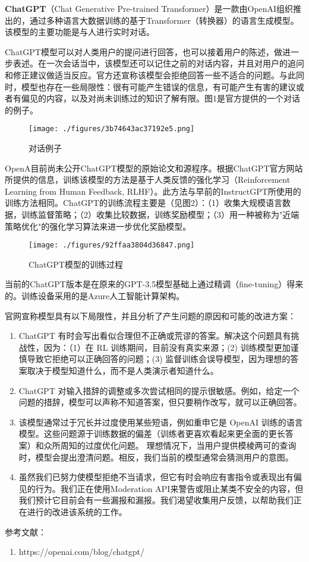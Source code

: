 
\textbf{ChatGPT}（Chat Generative Pre-trained Transformer）是一款由OpenAI组织推出的，通过多种语言大数据训练的基于Transformer（转换器）的语言生成模型。该模型的主要功能是与人进行实时对话。

ChatGPT模型可以对人类用户的提问进行回答，也可以接着用户的陈述，做进一步表述。在一次会话当中，该模型还可以记住之前的对话内容，并且对用户的追问和修正建议做适当反应。官方还宣称该模型会拒绝回答一些不适合的问题。与此同时，模型也存在一些局限性：很有可能产生错误的信息，有可能产生有害的建议或者有偏见的内容，以及对尚未训练过的知识了解有限。图1是官方提供的一个对话的例子。

\begin{figure}[ht]
\centering
\texttt{[image: ./figures/3b74643ac37192e5.png]}
\caption{对话例子} \label{fig_ChGPT_2}
\end{figure}

OpenA目前尚未公开ChatGPT模型的原始论文和源程序。根据ChatGPT官方网站所提供的信息，训练该模型的方法是基于人类反馈的强化学习（Reinforcement Learning from Human Feedback, RLHF）。此方法与早前的InstructGPT所使用的训练方法相同。ChatGPT的训练流程主要是（见图2）：（1）收集大规模语言数据，训练监督策略；（2）收集比较数据，训练奖励模型；（3）用一种被称为"近端策略优化"的强化学习算法来进一步优化奖励模型。
\begin{figure}[ht]
\centering
\texttt{[image: ./figures/92ffaa3804d36847.png]}
\caption{ChatGPT模型的训练过程} \label{fig_ChGPT_1}
\end{figure}
当前的ChatGPT版本是在原来的GPT-3.5模型基础上通过精调（fine-tuning）得来的。训练设备采用的是Azure人工智能计算架构。

官网宣称模型具有以下局限性，并且分析了产生问题的原因和可能的改进方案：
\begin{enumerate}
\item ChatGPT 有时会写出看似合理但不正确或荒谬的答案。解决这个问题具有挑战性，因为：（1）在 RL 训练期间，目前没有真实来源；(2) 训练模型更加谨慎导致它拒绝可以正确回答的问题；(3) 监督训练会误导模型，因为理想的答案取决于模型知道什么，而不是人类演示者知道什么。
\item ChatGPT 对输入措辞的调整或多次尝试相同的提示很敏感。例如，给定一个问题的措辞，模型可以声称不知道答案，但只要稍作改写，就可以正确回答。
\item 该模型通常过于冗长并过度使用某些短语，例如重申它是 OpenAI 训练的语言模型。这些问题源于训练数据的偏差（训练者更喜欢看起来更全面的更长答案）和众所周知的过度优化问题。
理想情况下，当用户提供模棱两可的查询时，模型会提出澄清问题。相反，我们当前的模型通常会猜测用户的意图。
\item 虽然我们已努力使模型拒绝不当请求，但它有时会响应有害指令或表现出有偏见的行为。我们正在使用Moderation API来警告或阻止某类不安全的内容，但我们预计它目前会有一些漏报和漏报。我们渴望收集用户反馈，以帮助我们正在进行的改进该系统的工作。
\end{enumerate}



参考文献：
\begin{enumerate}
\item https://openai.com/blog/chatgpt/
\end{enumerate}
